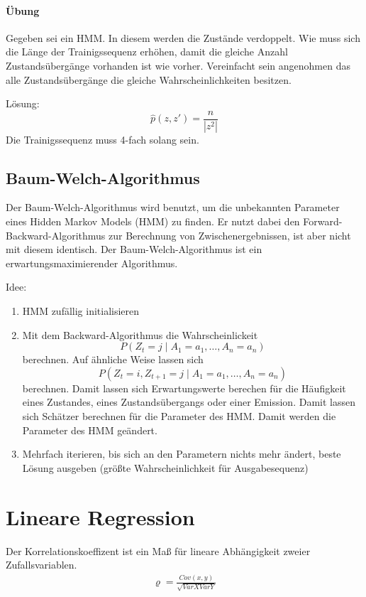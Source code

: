 \begin{shaded}
\paragraph{Übung}
\label{par:ubung2}

Gegeben sei ein HMM.
In diesem werden die Zustände verdoppelt.
Wie muss sich die Länge der Trainigssequenz erhöhen, damit die gleiche Anzahl Zustandsübergänge vorhanden ist wie vorher.
Vereinfacht sein angenohmen das alle Zustandsübergänge die gleiche Wahrscheinlichkeiten besitzen.

Lösung:
\[\hat p(z,z') = \frac{n}{|z^2|}\]
Die Trainigssequenz muss 4-fach solang sein.
\end{shaded}

\subsection{Baum-Welch-Algorithmus}
Der Baum-Welch-Algorithmus wird benutzt, um die unbekannten Parameter eines Hidden Markov Models (HMM) zu finden.
Er nutzt dabei den Forward-Backward-Algorithmus zur Berechnung von Zwischenergebnissen, ist aber nicht mit diesem identisch.
Der Baum-Welch-Algorithmus ist ein erwartungsmaximierender Algorithmus.

Idee:
\begin{enumerate}
    \item HMM zufällig initialisieren
    \item Mit dem Backward-Algorithmus die Wahrscheinlickeit \[P(Z_{t} = j \mid  A_{1} = a_{1}, \ldots, A_{n} = a_{n})\]berechnen.
        Auf ähnliche Weise lassen sich \[P(Z_{t} = i, Z_{t+1} = j \mid A_{1} = a_{1}, \ldots, A_{n} = a_{n})\] berechnen.
        Damit lassen sich Erwartungswerte berechen für die Häufigkeit eines Zustandes, eines Zustandsübergangs oder einer Emission.
        Damit lassen sich Schätzer berechnen für die Parameter des HMM.
        Damit werden die Parameter des HMM geändert.
    \item Mehrfach iterieren, bis sich an den Parametern nichts mehr ändert, beste Lösung ausgeben (größte Wahrscheinlichkeit für Ausgabesequenz)
\end{enumerate}

\section{Lineare Regression}
\label{sec:lineare_regression}
Der Korrelationskoeffizent ist ein Maß für lineare Abhängigkeit zweier
Zufallsvariablen.
\begin{align*}
    \varrho = \frac{Cov(x,y)}{\sqrt{Var X Var Y}}
\end{align*}

